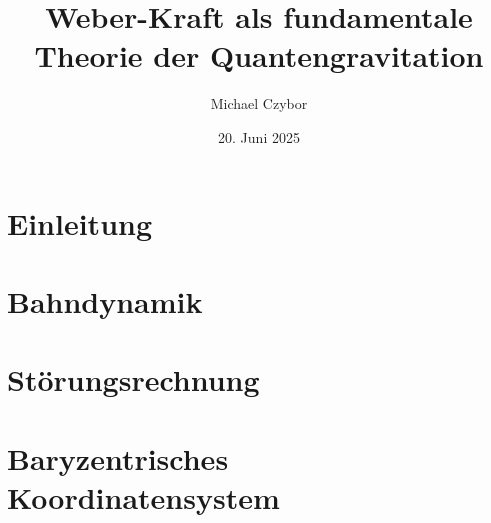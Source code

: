 \documentclass{book}
\title{Weber-Kraft als fundamentale Theorie der Quantengravitation}
\author{Michael Czybor}
\date{20. Juni 2025}
\begin{document}
\maketitle
\tableofcontents
\chapter{Einleitung}

















\chapter{Bahndynamik}










\chapter{Störungsrechnung}






\chapter{Baryzentrisches Koordinatensystem}




\end{document}
